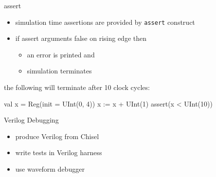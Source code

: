 \documentclass[xcolor=pdflatex,dvipsnames,table]{beamer}
\begin{document}
\begin{frame}[fragile]{assert}
\begin{itemize}
\item simulation time assertions are provided by \verb+assert+ construct
\item if assert arguments false on rising edge then 
\begin{itemize}
\item an error is printed and 
\item simulation terminates
\end{itemize}
\end{itemize}
the following will terminate after 10 clock cycles:
\begin{scala}
val x = Reg(init = UInt(0, 4))
x := x + UInt(1)
assert(x < UInt(10))
\end{scala}
\end{frame}

\begin{frame}{Verilog Debugging}
\begin{itemize}
\item produce Verilog from Chisel
\item write tests in Verilog harness
\item use waveform debugger
\end{itemize}
\end{frame}
\end{document}

